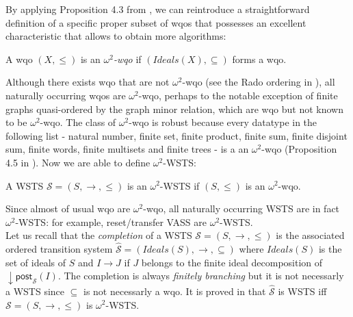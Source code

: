 \documentclass[runningheads]{llncs}
\newcommand{\post}{\textsf{post}}
\begin{document}
By applying Proposition 4.3 from \cite{DBLP:journals/corr/abs-1208-4549}, we can reintroduce a straightforward definition of a specific proper subset of wqos that possesses an excellent characteristic that allows to obtain more algorithms: 

\begin{definition}
A wqo $(X, \leq)$ is an \emph{$\omega^2$-wqo} if $(Ideals(X), \subseteq)$ forms a wqo.
\end{definition}


Although there exists wqo that are not $\omega^2$-wqo (see the Rado ordering in \cite{DBLP:journals/ipl/Jancar99}), all naturally occurring wqos are $\omega^2$-wqo, perhaps to the notable exception of ﬁnite graphs quasi-ordered by the graph minor relation, which are wqo but not known to be $\omega^2$-wqo. The class of $\omega^2$-wqo is robust because every datatype in the following list - natural number, finite set, ﬁnite product, ﬁnite sum, finite disjoint sum, ﬁnite words, ﬁnite multisets and ﬁnite trees - is a an $\omega^2$-wqo (Proposition 4.5 in \cite{DBLP:journals/corr/abs-1208-4549}). Now we are able to define $\omega^2$-WSTS:

\begin{definition} \cite{DBLP:journals/corr/abs-1208-4549}
A WSTS  $\mathscr{S}=(S, \rightarrow, \leq)$
is an $\omega^2$-WSTS if $(S, \leq)$ is an $\omega^2$-wqo.
\end{definition}
Since almost of usual wqo are $\omega^2$-wqo, all naturally occurring WSTS are in fact $\omega^2$-WSTS: for example, reset/transfer VASS are $\omega^2$-WSTS.\\

Let us recall that the \emph{completion}  \cite{BFM-ic17} of a WSTS $\mathscr{S}=(S,\rightarrow, \leq)$ is the associated ordered transition system $\hat{\mathscr{S}}=(Ideals(S),\rightarrow, \subseteq)$ where $Ideals(S)$ is the set of ideals of $S$ and $I \rightarrow J$ if $J$ belongs to the finite ideal decomposition of $\downarrow \post_{\mathscr{S}}(I)$. The completion is always \emph{finitely branching} but it is not necessarly a WSTS since $\subseteq$ is not necessarly a wqo. It is proved in  \cite{BFM-ic17} that $\hat{\mathscr{S}}$ is WSTS iff $\mathscr{S}=(S,\rightarrow, \leq)$ is $\omega^2$-WSTS. \\
\end{document}
